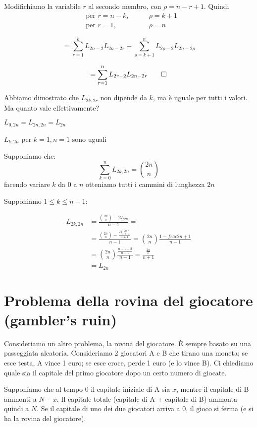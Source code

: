 \documentclass[a4paper,12pt]{book}
\begin{document}

Modifichiamo la variabile $ r $ al secondo membro, con $ \rho = n -r + 1 $. Quindi 
\begin{align*}
	& \text{per } r = n - k, & \qquad \rho = k + 1 \\
	& \text{per } r = 1, & \qquad \rho = n
\end{align*}

$$ = \sum_{r=1}^{k}L_{2n-2}L_{2n-2r} + \sum_{\rho = k+1}^{n} L_{2\rho - 2} L_{2n - 2\rho}$$

$$ = \sum_{r=1}^{n} L_{2r-2}L_{2n-2r} \qed$$

Abbiamo dimostrato che $ L_{2k,2r} $ non dipende da $ k $, ma è uguale per tutti i valori. Ma quanto vale effettivamente?

$ L_{0, 2n} = L_{2n,2n} = L_{2n} $

$ L_{k,2n} $ per $ k = 1, n = 1 $ sono uguali

Supponiamo che: 
$$ \sum_{k=0}^{n} L_{2k,2n} = \binom{2n}{n} $$
facendo variare $ k $ da 0 a $ n $ otteniamo tutti i cammini di lunghezza $ 2n $

Supponiamo $ 1 \le k \le n-1 $:

\begin{align*}
	L_{2k, 2n} & = \frac{\binom{2n}{n} - 2L_{2n}}{n-1} = \\
	& = \frac{\binom{2n}{n} - \frac{2\binom{2n}{n}}{n+1}}{n-1} = \binom{2n}{n} \frac{1 - frac{2}{n+1}}{n-1} \\
	& = \binom{2n}{n}\frac{\frac{n+1-2}{n+1}}{n-1} = \frac{\frac{2n}{n}}{n+1} \\
	& = L_{2n}
\end{align*}

\section{Problema della rovina del giocatore (gambler's ruin)}
Consideriamo un altro problema, la rovina del giocatore. È sempre basato su una passeggiata aleatoria. Consideriamo 2 giocatori A e B che tirano una moneta; se esce testa, A vince 1 euro; se esce croce, perde 1 euro (e lo vince B). Ci chiediamo quale sia il capitale del primo giocatore dopo un certo numero di giocate. 

Supponiamo che al tempo 0 il capitale iniziale di A sia $ x $, mentre il capitale di B ammonti a $ N - x $. Il capitale totale (capitale di A + capitale di B) ammonta quindi a $ N $. Se il capitale di uno dei due giocatori arriva a 0, il gioco si ferma (e si ha la rovina del giocatore). 
\end{document}
